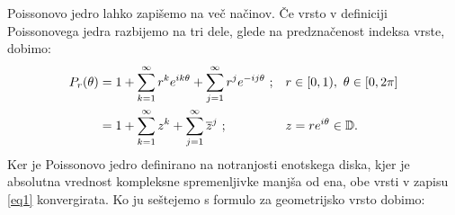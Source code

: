 \documentclass[mat1]{fmfdelo}
\begin{document}
    Poissonovo jedro lahko zapišemo na več načinov. Če vrsto v definiciji Poissonovega jedra razbijemo na tri dele, glede na predznačenost indeksa vrste, dobimo:
    \begin{align}
        P_r(\theta) &=  1 + \sum_{k = 1}^{\infty}{r^{k} e^{i k \theta}} +  \sum_{j = 1}^{\infty}{r^{j} e^{-i j \theta}}~;  &  &r \in [0,1),~\theta \in [0,2\pi] \label{eq1}\\
        &= 1 + \sum_{k=1}^{\infty}{z^k} + \sum_{j=1}^{\infty}{\overline{z}^{j}}~;   & &z = r e^{i\theta} \in \mathbb{D}. \notag
    \end{align}
    Ker je Poissonovo jedro definirano na notranjosti enotskega diska, kjer je absolutna vrednost kompleksne spremenljivke manjša od ena, obe vrsti v zapisu \eqref{eq1} konvergirata.
    Ko ju seštejemo s formulo za geometrijsko vrsto dobimo:
\end{document}
